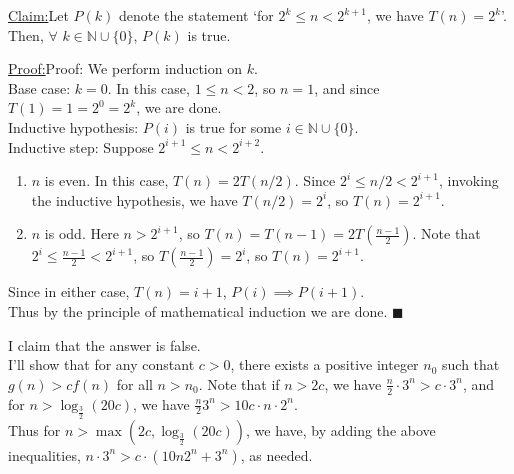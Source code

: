 \documentclass[answers]{exam}
\newenvironment{claim}[1]{\par\noindent\underline{Claim:}\space#1}{}
\newenvironment{proof}[1]{\par\noindent\underline{Proof:}\space#1}{\hfill $\blacksquare$}
\begin{document}
\begin{questions}

    \question
    \begin{solution}
    \begin{claim}
        Let $P(k)$ denote the statement `for $2^k \le n < 2^{k + 1}$, we have $T(n) = 2^k$'.
        Then, $\forall \,\, k \in \mathbb{N}\cup \{0\}$, $P(k)$ is true.
    \end{claim}
    \begin{proof}
    Proof:
        We perform induction on $k$.\\
        Base case: $k = 0$. In this case, $1 \le n < 2$, so $n = 1$, and since $T(1) = 1 = 2^0 = 2^k$, we are done.\\
        Inductive hypothesis: $P(i)$ is true for some $i \in \mathbb{N} \cup \{0\}$.\\
        Inductive step: Suppose $2^{i + 1} \le n < 2^{i + 2}$.

\begin{enumerate}
\item $n$ is even. In this case, $T(n) = 2T(n / 2)$. Since $2^i \le n / 2 < 2^{i + 1}$, invoking the inductive hypothesis, we have $T(n / 2) = 2^{i}$, so $T(n) = 2^{i + 1}$.
\item $n$ is odd. Here $n > 2^{i + 1}$, so $T(n) = T(n - 1) = 2T(\frac{n - 1}{2})$. Note that $2^i \le \frac{n - 1}{2} < 2^{i + 1}$, so $T(\frac{n - 1}{2}) = 2^i$, so $T(n) = 2^{i + 1}$.
\end{enumerate}
        
        Since in either case, $T(n) = i + 1$, $P(i) \implies P(i + 1)$.\\
        Thus by the principle of mathematical induction we are done.
    \end{proof}
\end{solution}

\question

    \begin{solution}
        I claim that the answer is false.\\
        I'll show that for any constant $c > 0$, there exists a positive integer $n_0$ such that $g(n) > c f(n)$ for all $n > n_0$.
        Note that if $n > 2c$, we have $\frac{n}{2} \cdot 3^n > c \cdot 3^n$, and for $n > \log_{\frac{3}{2}} (20c)$, we have $\frac{n}{2} 3^n > 10c \cdot n \cdot 2^n$.\\
        Thus for $n > \max(2c, \log_{\frac32}(20c))$, we have, by adding the above inequalities, $n \cdot 3^n > c \cdot \left(10n2^n + 3^n\right)$, as needed.
    \end{solution}

\end{questions}
\end{document}
